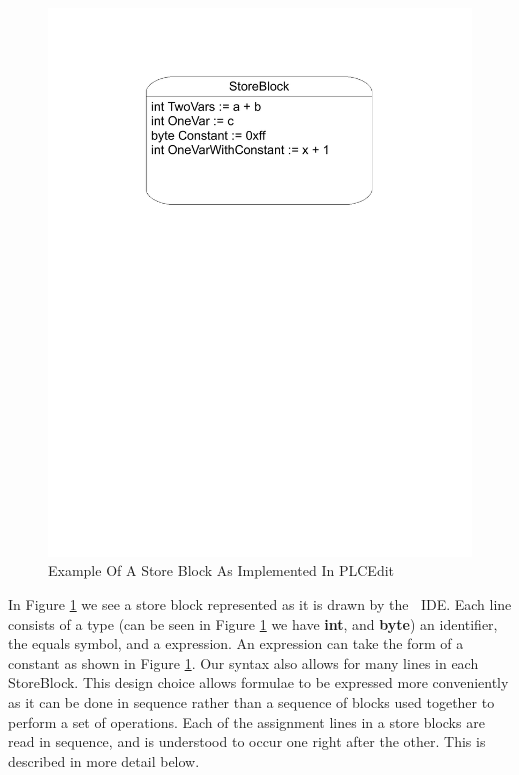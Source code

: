 \begin{figure}[htp]
    \centering
    \includegraphics[trim= 20mm 175mm 20mm 10mm, clip, width=\imgmedium]{./images/state_storeblock.pdf}
    \caption{Example Of A Store Block As Implemented In PLCEdit}
    \label{fig:state_storeblock}
\end{figure}

In Figure \ref{fig:state_storeblock} we see a store block represented as it is drawn by the \plcchart $\:$ IDE. Each line consists of a type (can be seen in Figure \ref{fig:state_storeblock} we have \textbf{int}, and \textbf{byte}) an identifier, the equals symbol, and a expression. An expression can take the form of a constant as shown in Figure \ref{fig:state_storeblock}. Our syntax also allows for many lines in each StoreBlock. This design choice allows formulae to be expressed more conveniently as it can be done in sequence rather than a sequence of blocks used together to perform a set of operations.
Each of the assignment lines in a store blocks are read in sequence, and is understood to occur one right after the other. This is described in more detail below.


